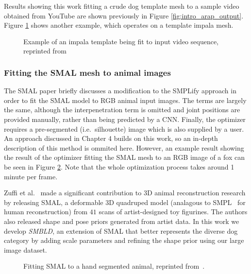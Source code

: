     Results showing this work fitting a crude dog template mesh to a sample video obtained from YouTube are shown previously in Figure \ref{fig:intro_arap_output}. Figure \ref{fig:arap_output} shows another example, which operates on a template impala mesh.

    \begin{figure}[H]
        \caption{Example of an impala template being fit to input video sequence, reprinted from~\cite{arap_stebbing}}
        \label{fig:arap_output}
    \end{figure}


    \subsubsection{Fitting the SMAL mesh to animal images}
    The SMAL paper briefly discusses a modification to the SMPLify approach in order to fit the SMAL model to RGB animal input images. The terms are largely the same, although the interpenetration term is omitted and joint positions are provided manually, rather than being predicted by a CNN. Finally, the optimizer requires a pre-segmented (i.e.\ silhouette) image which is also supplied by a user. An approach discussed in Chapter 4 builds on this work, so an in-depth description of this method is ommited here. However, an example result showing the result of the optimizer fitting the SMAL mesh to an RGB image of a fox can be seen in Figure \ref{fig:smalify}. Note that the whole optimization process takes around 1 minute per frame.

    Zuffi et al.~\cite{zuffi2017menagerie} made a significant contribution to 3D animal reconstruction research by releasing SMAL, a deformable 3D quadruped model (analagous to SMPL~\cite{loper15smpl} for human reconstruction) from $41$ scans of artist-designed toy figurines. The authors also released shape and pose priors generated from artist data. In this work we develop \emph{SMBLD}, an extension of SMAL that better represents the diverse dog category by adding scale parameters and refining the shape prior using our large image dataset.


    \begin{figure}[H] %
        \caption{Fitting SMAL to a hand segmented animal, reprinted from~\cite{zuffi2017menagerie}.}
        \label{fig:smalify}
    \end{figure}


